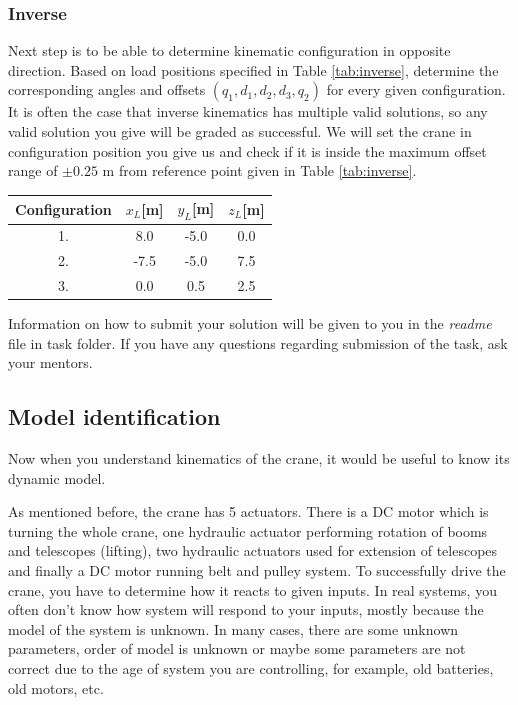 \documentclass{article}
\begin{document}
	\subsubsection{Inverse}
	
	Next step is to be able to determine kinematic configuration in opposite direction. Based on load positions specified in Table \ref{tab:inverse}, determine the corresponding angles and offsets $(q_1, d_1, d_2, d_3, q_2)$ for every given configuration. It is often the case that inverse kinematics has multiple valid solutions, so any valid solution you give will be graded as successful. We will set the crane in configuration position you give us and check if it is inside the maximum offset range of $\pm 0.25$ m from reference point given in Table \ref{tab:inverse}.
	
	\begin{center}
		\label{tab:inverse}
		\label{tab:inverse}
		\begin{tabular}{|| c || c c c ||}
			\hline
			Configuration & $x_L$[m] & $y_L$[m] & $z_L$[m] \\
			\hline\hline
			1. & 8.0 & -5.0 & 0.0\\ 
			\hline
			2. & -7.5 & -5.0 & 7.5 \\
			\hline
			3. & 0.0 & 0.5 & 2.5 \\
			\hline
		\end{tabular}
	\end{center}
	
	\noindent
	Information on how to submit your solution will be given to you in the \textit{readme} file in task folder. If you have any questions regarding submission of the task, ask your mentors.
	
	\subsection{Model identification}
	
	Now when you understand kinematics of the crane, it would be useful to know its dynamic model.
	
	As mentioned before, the crane has 5 actuators. There is a DC motor which is turning the whole crane, one hydraulic actuator performing rotation of booms and telescopes (lifting), two hydraulic actuators used for extension of telescopes and finally a DC motor running belt and pulley system. To successfully drive the crane, you have to determine how it reacts to given inputs. In real systems, you often don't know how system will respond to your inputs, mostly because the model of the system is unknown. In many cases, there are some unknown parameters, order of model is unknown or maybe some parameters are not correct due to the age of system you are controlling, for example, old batteries, old motors, etc.
	
\end{document}
